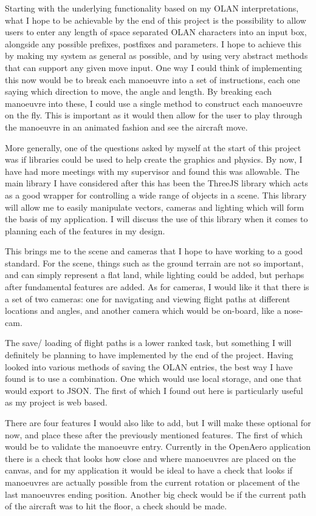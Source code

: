 Starting with the underlying functionality based on my OLAN interpretations, what I hope to be achievable by the end of this project is the possibility to allow users to enter any length of space separated OLAN characters into an input box, alongside any possible prefixes, postfixes and parameters. I hope to achieve this by making my system as general as possible, and by using very abstract methods that can support any given move input. One way I could think of implementing this now would be to break each manoeuvre into a set of instructions, each one saying which direction to move, the angle and length. By breaking each manoeuvre into these, I could use a single method to construct each manoeuvre on the fly. This is important as it would then allow for the user to play through the manoeuvre in an animated fashion and see the aircraft move.

More generally, one of the questions asked by myself at the start of this project was if libraries could be used to help create the graphics and physics. By now, I have had more meetings with my supervisor and found this was allowable. The main library I have considered after this has been the ThreeJS\cite{ThreeJs} library which acts as a good wrapper for controlling a wide range of objects in a scene. This library will allow me to easily manipulate vectors, cameras and lighting which will form the basis of my application. I will discuss the use of this library when it comes to planning each of the features in my design.

This brings me to the scene and cameras that I hope to have working to a good standard. For the scene, things such as the ground terrain are not so important, and can simply represent a flat land, while lighting could be added, but perhaps after fundamental features are added. As for cameras, I would like it that there is a set of two cameras: one for navigating and viewing flight paths at different locations and angles, and another camera which would be on-board, like a nose-cam.

The save/ loading of flight paths is a lower ranked task, but something I will definitely be planning to have implemented by the end of the project. Having looked into various methods of saving the OLAN entries, the best way I have found is to use a combination. One which would use local storage, and one that would export to JSON. The first of which I found out here\cite{Local_Storage} is particularly useful as my project is web based.

There are four features I would also like to add, but I will make these optional for now, and place these after the previously mentioned features. The first of which would be to validate the manoeuvre entry. Currently in the OpenAero application there is a check that looks how close and where manoeuvres are placed on the canvas, and for my application it would be ideal to have a check that looks if manoeuvres are actually possible from the current rotation or placement of the last manoeuvres ending position. Another big check would be if the current path of the aircraft was to hit the floor, a check should be made.

